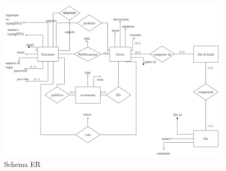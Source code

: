 \begin{figure}[hbt!]
    \centering
    \includegraphics[angle=-90, width=\textwidth]{schemaER}
    \caption{Schema ER}
\end{figure}

